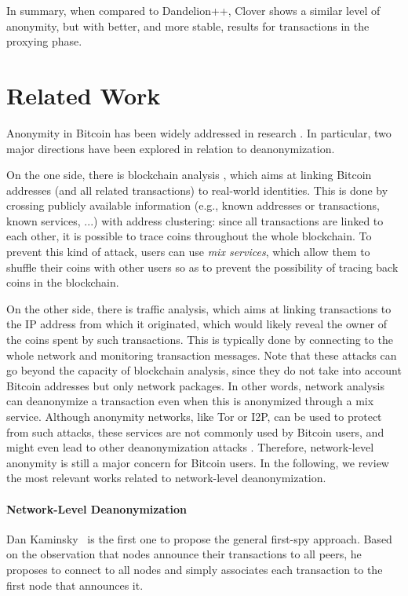 \documentclass{article}
\begin{document}
	In summary, when compared to Dandelion++, Clover shows a similar level of anonymity, but with better, and more stable, results for transactions in the proxying phase.
	
	\section{Related Work}
	Anonymity in Bitcoin has been widely addressed in research \cite{herrera2015research}.
	In particular, two major directions have been explored in relation to deanonymization.
	
	On the one side, there is blockchain analysis \cite{meiklejohn2013fistful, reid2013analysis}, which aims at linking Bitcoin addresses (and all related transactions) to real-world identities. 
	This is done by crossing publicly available information (e.g., known addresses or transactions, known services, ...) with address clustering: since all transactions are linked to each other, it is possible to trace coins throughout the whole blockchain.
	To prevent this kind of attack, users can use \textit{mix services}, which allow them to shuffle their coins with other users so as to prevent the possibility of tracing back coins in the blockchain.
	
	On the other side, there is traffic analysis, which aims at linking transactions to the IP address from which it originated, which would likely reveal the owner of the coins spent by such transactions.
	This is typically done by connecting to the whole network and monitoring transaction messages.
	Note that these attacks can go beyond the capacity of blockchain analysis, since they do not take into account Bitcoin addresses but only network packages.
	In other words, network analysis can deanonymize a transaction even when this is anonymized through a mix service.
	Although anonymity networks, like Tor or I2P, can be used to protect from such attacks, these services are not commonly used by Bitcoin users, and might even lead to other deanonymization attacks \cite{biryukov2015tor}.
	Therefore, network-level anonymity is still a major concern for Bitcoin users.
	In the following, we review the most relevant works related to network-level deanonymization.
	
	\paragraph{Network-Level Deanonymization}
	Dan Kaminsky~\cite{kaminsky2011black} is the first one to propose the general first-spy approach. 
	Based on the observation that nodes announce their transactions to all peers, he proposes to connect to all nodes and simply associates each transaction to the first node that announces it.
	
\end{document}
